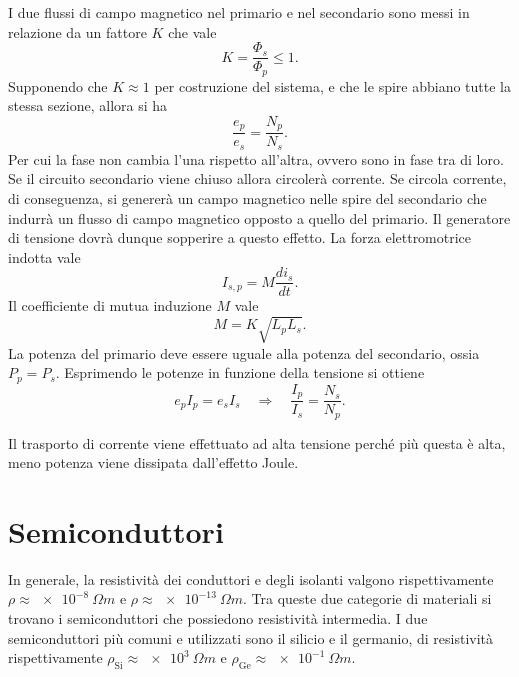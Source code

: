 I due flussi di campo magnetico nel primario e nel secondario sono messi in relazione da un fattore $K$ che vale
\begin{equation}
    K=\frac{\Phi_s}{\Phi_p}\le1.
\end{equation}
Supponendo che $K\approx 1$ per costruzione del sistema, e che le spire abbiano tutte la stessa sezione, allora si ha
\begin{equation}
    \frac{e_p}{e_s}=\frac{N_p}{N_s}.
\end{equation}
Per cui la fase non cambia l'una rispetto all'altra, ovvero sono in fase tra di loro. Se il circuito secondario viene chiuso allora circolerà corrente. Se circola corrente, di conseguenza, si genererà un campo magnetico nelle spire del secondario che indurrà un flusso di campo magnetico opposto a quello del primario. Il generatore di tensione dovrà dunque sopperire a questo effetto. La forza elettromotrice indotta vale
\begin{equation}
    I_{s,p}=M\frac{di_s}{dt}.
\end{equation}
Il coefficiente di mutua induzione $M$ vale 
\begin{equation}
    M=K\sqrt{L_pL_s}.
\end{equation}
La potenza del primario deve essere uguale alla potenza del secondario, ossia $P_p=P_s$. Esprimendo le potenze in funzione della tensione si ottiene
\begin{equation}
    e_pI_p=e_sI_s\quad\Rightarrow\quad\frac{I_p}{I_s}=\frac{N_s}{N_p}.
\end{equation}
\begin{obs}
    Il trasporto di corrente viene effettuato ad alta tensione perché più questa è alta, meno potenza viene dissipata dall'effetto Joule.
\end{obs}

\section{Semiconduttori}
In generale, la resistività dei conduttori e degli isolanti valgono rispettivamente $\rho\approx\SI{e-8}{\Omega m}$ e $\rho\approx\SI{e-13}{\Omega m}$. Tra queste due categorie di materiali si trovano i semiconduttori che possiedono resistività intermedia. I due semiconduttori più comuni e utilizzati sono il silicio e il germanio, di resistività rispettivamente $\rho_{\mathrm{Si}}\approx\SI{e3}{\Omega m}$ e $\rho_\mathrm{Ge}\approx\SI{e-1}{\Omega m}$.

